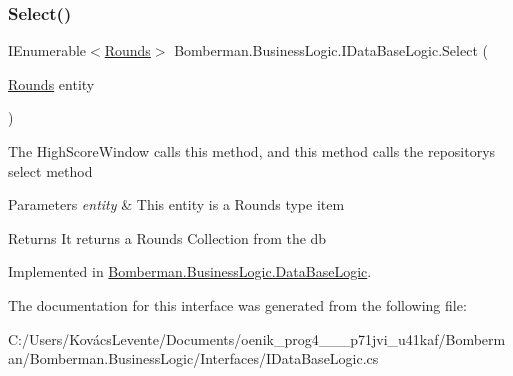 \subsubsection{\texorpdfstring{Select()}{Select()}}
{\footnotesize\ttfamily I\+Enumerable$<$\mbox{\hyperlink{class_bomberman_1_1_data_1_1_rounds}{Rounds}}$>$ Bomberman.\+Business\+Logic.\+I\+Data\+Base\+Logic.\+Select (\begin{DoxyParamCaption}\item[{\mbox{\hyperlink{class_bomberman_1_1_data_1_1_rounds}{Rounds}}}]{entity }\end{DoxyParamCaption})}



The High\+Score\+Window calls this method, and this method calls the repository\textquotesingle{}s select method 


\begin{DoxyParams}{Parameters}
{\em entity} & This entity is a Rounds type item \\
\hline
\end{DoxyParams}
\begin{DoxyReturn}{Returns}
It returns a Rounds Collection from the db
\end{DoxyReturn}


Implemented in \mbox{\hyperlink{class_bomberman_1_1_business_logic_1_1_data_base_logic_a7535cc3e0b6ea882d06a83a07ab4e083}{Bomberman.\+Business\+Logic.\+Data\+Base\+Logic}}.



The documentation for this interface was generated from the following file\+:\begin{DoxyCompactItemize}
\item 
C\+:/\+Users/\+Kovács\+Levente/\+Documents/oenik\+\_\+prog4\+\_\+\_\+\_\+p71jvi\+\_\+u41kaf/\+Bomberman/\+Bomberman.\+Business\+Logic/\+Interfaces/I\+Data\+Base\+Logic.\+cs\end{DoxyCompactItemize}
